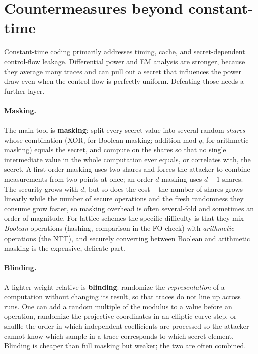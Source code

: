 \section{Countermeasures beyond constant-time}

Constant-time coding primarily addresses timing, cache, and secret-dependent control-flow leakage. Differential power and EM analysis are stronger, because they average many
traces and can pull out a secret that influences the power draw even when the control
flow is perfectly uniform. Defeating those needs a further layer.

\paragraph{Masking.}
The main tool is \textbf{masking}: split every secret value into several random
\emph{shares} whose combination (XOR, for Boolean masking; addition mod $q$, for
arithmetic masking) equals the secret, and compute on the shares so that no single
intermediate value in the whole computation ever equals, or correlates with, the
secret. A first-order masking uses two shares and forces the attacker to combine
measurements from two points at once; an order-$d$ masking uses $d+1$ shares. The
security grows with $d$, but so does the cost -- the number of shares grows linearly
while the number of secure operations and the fresh randomness they consume grow
faster, so masking overhead is often several-fold and sometimes an order of magnitude.
For lattice schemes the specific difficulty is that they mix \emph{Boolean} operations
(hashing, comparison in the FO check) with \emph{arithmetic} operations (the NTT), and
securely converting between Boolean and arithmetic masking is the expensive, delicate
part.

\paragraph{Blinding.}
A lighter-weight relative is \textbf{blinding}: randomize the \emph{representation} of
a computation without changing its result, so that traces do not line up across runs.
One can add a random multiple of the modulus to a value before an operation, randomize
the projective coordinates in an elliptic-curve step, or shuffle the order in which
independent coefficients are processed so the attacker cannot know which sample in a
trace corresponds to which secret element. Blinding is cheaper than full masking but
weaker; the two are often combined.

